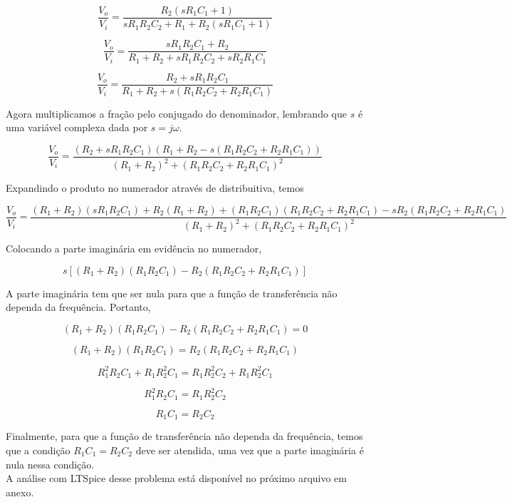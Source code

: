 \documentclass[12pt]{scrartcl}
\begin{document}
\[ \frac{V_o}{V_i} = \frac{R_2(sR_1C_1 + 1)}{sR_1R_2C_2 + R_1 + R_2(sR_1C_1 + 1)}  \]

\[ \frac{V_o}{V_i} = \frac{sR_1R_2C_1 + R_2}{R_1 + R_2 + sR_1R_2C_2 + sR_2R_1C_1}  \]

\[ \frac{V_o}{V_i} = \frac{R_2 + sR_1R_2C_1}{R_1 + R_2 + s(R_1R_2C_2 + R_2R_1C_1)}  \]

Agora multiplicamos a fração pelo conjugado do denominador, lembrando que $s$ é uma variável complexa
dada por $s = j\omega$.

\[ \frac{V_o}{V_i} = \frac{(R_2 + sR_1R_2C_1) (R_1 + R_2 - s(R_1R_2C_2 + R_2R_1C_1))}{(R_1 + R_2)^2 + (R_1R_2C_2 + R_2R_1C_1)^2}  \]

Expandindo o produto no numerador através de distribuitiva, temos

\[ \frac{V_o}{V_i} = \frac{(R_1 + R_2)(sR_1R_2C_1) + R_2(R_1 + R_2) + (R_1R_2C_1)(R_1R_2C_2 + R_2R_1C_1) - sR_2(R_1R_2C_2 + R_2R_1C_1)}{(R_1 + R_2)^2 + (R_1R_2C_2 + R_2R_1C_1)^2}  \]

Colocando a parte imaginária em evidência no numerador,

\[ s\left[(R_1 + R_2)(R_1R_2C_1) - R_2(R_1R_2C_2 + R_2R_1C_1)\right] \]

A parte imaginária tem que ser nula para que a função de transferência não dependa
da frequência. Portanto,

\[ (R_1 + R_2)(R_1R_2C_1) - R_2(R_1R_2C_2 + R_2R_1C_1) = 0 \]

\[ (R_1 + R_2)(R_1R_2C_1) = R_2(R_1R_2C_2 + R_2R_1C_1) \]

\[ R_1^2R_2C_1 + R_1R_2^2C_1 = R_1R_2^2C_2 + R_1R_2^2C_1 \]

\[ R_1^2R_2C_1 = R_1R_2^2C_2 \]

\[ \boxed{ R_1C_1 = R_2C_2} \]

Finalmente, para que a função de transferência não dependa da frequência, temos que a condição 
$R_1C_1 = R_2C_2$ deve ser atendida, uma vez que a parte imaginária é nula nessa condição. \\





A análise com LTSpice desse problema está disponível no próximo arquivo em anexo.
\end{document}
